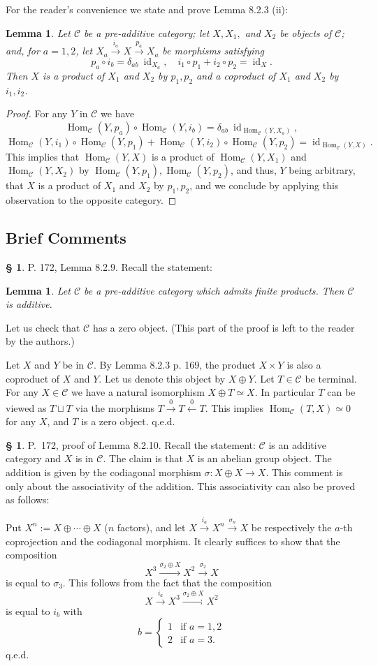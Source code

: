 \documentclass[12pt]{article}
\newtheorem{lem}[thm]{Lemma}
\theoremstyle{remark}
\theoremstyle{definition}
\newtheorem{s}[thm]{\S}
\newcommand{\C}{\mathcal C}
\newcommand{\xl}{\xleftarrow}
\newcommand{\xr}{\xrightarrow}
\newcommand{\bc}{\subsection{Brief Comments}}
\DeclareMathOperator{\id}{id}
\DeclareMathOperator{\Hom}{Hom}%
\begin{document}
For the reader's convenience we state and prove Lemma 8.2.3 (ii):
%
\begin{lem}\label{823ii}
Let $\C$ be a pre-additive category; let $X,X_1,$ and $X_2$ be objects of $\C$; and, for $a=1,2$, let $X_a\xr{i_a}X\xr{p_a}X_a$ be morphisms satisfying 
$$
p_a\circ i_b=\delta_{ab}\ \id_{X_a},\quad i_1\circ p_1+i_2\circ p_2=\id_X.
$$
Then $X$ is a product of $X_1$ and $X_2$ by $p_1,p_2$ and a coproduct of $X_1$ and $X_2$ by $i_1,i_2$. 
\end{lem}
%
\begin{proof}
For any $Y$ in $\C$ we have 
$$
\Hom_\C(Y,p_a)\circ\Hom_\C(Y,i_b)=\delta_{ab}\ \id_{\Hom_\C(Y,X_a)},
$$ 
$$
\Hom_\C(Y,i_1)\circ\Hom_\C(Y,p_1)+\Hom_\C(Y,i_2)\circ\Hom_\C(Y,p_2)=\id_{\Hom_\C(Y,X)}.
$$ 
This implies that $\Hom_\C(Y,X)$ is a product of $\Hom_\C(Y,X_1)$ and $\Hom_\C(Y,X_2)$ by $\Hom_\C(Y,p_1),\Hom_\C(Y,p_2)$, and thus, $Y$ being arbitrary, that $X$ is a product of $X_1$ and $X_2$ by $p_1,p_2$, and we conclude by applying this observation to the opposite category.
\end{proof}
%
%
\bc
%
%
\begin{s} 
P. 172, Lemma 8.2.9. Recall the statement:
%
\begin{lem}
Let $\C$ be a pre-additive category which admits finite products. Then $\C$ is additive.
\end{lem}
%
Let us check that $\C$ has a zero object. (This part of the proof is left to the reader by the authors.) 

Let $X$ and $Y$ be in $\C$. By Lemma 8.2.3 p. 169, the product $X\times Y$ is also a coproduct of $X$ and $Y$. Let us denote this object by $X\oplus Y$. Let $T\in\C$ be terminal. For any $X\in\C$ we have a natural isomorphism $X\oplus T\simeq X$. In particular $T$ can be viewed as $T\sqcup T$ via the morphisms $T\xr0T\xl0T$. This implies $\Hom_\C(T,X)\simeq0$ for any $X$, and $T$ is a zero object. q.e.d.
\end{s}
%
%
\begin{s} 
P.~172, proof of Lemma 8.2.10. Recall the statement: $\C$ is an additive category and $X$ is in $\C$. The claim is that $X$ is an abelian group object. The addition is given by the codiagonal morphism $\sigma:X\oplus X\to X$. This comment is only about the associativity of the addition. This associativity can also be proved as follows:

Put $X^n:=X\oplus\cdots\oplus X$ ($n$ factors), and let $X\xr{i_a}X^n\xr{\sigma_n}X$ be respectively the $a$-th coprojection and the codiagonal morphism. It clearly suffices to show that the composition 
$$
X^3\xr{\sigma_2\oplus X}X^2\xr{\sigma_2}X
$$ 
is equal to $\sigma_3$. This follows from the fact that the composition 
$$
X\xr{i_a}X^3\xr{\sigma_2\oplus X}X^2
$$ 
is equal to $i_b$ with 
$$
b=\begin{cases}1&\text{if }a=1,2\\2&\text{if }a=3.\end{cases}
$$ 
q.e.d.
\end{s}
\end{document}
